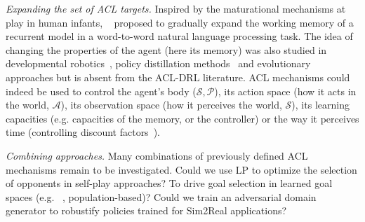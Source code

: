 \documentclass{article}
\newcommand{\mycite}[1]{\citeauthor{#1}~\shortcite{#1}}
\begin{document}

\noindent\textit{Expanding the set of ACL targets.} Inspired by the maturational mechanisms at play in human infants, \mycite{elman} proposed to gradually expand the working memory of a recurrent model in a word-to-word natural language processing task. The idea of changing the properties of the agent (here its memory) was also studied in developmental robotics~\cite{mature}, policy distillation methods~\cite{mixmatch,pol-dil-review} and evolutionary approaches \cite{ha-design}  but is absent from the ACL-DRL literature. ACL mechanisms could indeed be used to control the agent's body ($\mathcal{S}, \mathcal{P}$), its action space (how it acts in the world, $\mathcal{A}$), its observation space (how it perceives the world, $\mathcal{S}$), its learning capacities (e.g. capacities of the memory, or the controller) or the way it perceives time (controlling discount factors~\cite{cl-discount}).

\noindent\textit{Combining approaches.} Many combinations of previously defined ACL mechanisms remain to be investigated. Could we use LP to optimize the selection of opponents in self-play approaches? To drive goal selection in learned goal spaces (e.g. \mycite{Finot2019}, population-based)? Could we train an adversarial domain generator to robustify policies trained for Sim2Real applications?
\end{document}
